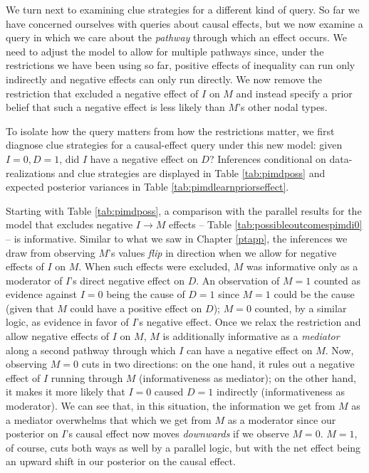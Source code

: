 \documentclass[
  12pt,
]{book}
\begin{document}
We turn next to examining clue strategies for a different kind of query. So far we have concerned ourselves with queries about causal effects, but we now examine a query in which we care about the \emph{pathway} through which an effect occurs. We need to adjust the model to allow for multiple pathways since, under the restrictions we have been using so far, positive effects of inequality can run only indirectly and negative effects can only run directly. We now remove the restriction that excluded a negative effect of \(I\) on \(M\) and instead specify a prior belief that such a negative effect is less likely than \(M\)'s other nodal types.

To isolate how the query matters from how the restrictions matter, we first diagnose clue strategies for a causal-effect query under this new model: given \(I=0, D=1\), did \(I\) have a negative effect on \(D\)? Inferences conditional on data-realizations and clue strategies are displayed in Table \ref{tab:pimdposs} and expected posterior variances in Table \ref{tab:pimdlearnpriorseffect}.

Starting with Table \ref{tab:pimdposs}, a comparison with the parallel results for the model that excludes negative \(I \rightarrow M\) effects -- Table \ref{tab:possibleoutcomespimdi0} -- is informative. Similar to what we saw in Chapter \ref{ptapp}, the inferences we draw from observing \(M\)'s values \emph{flip} in direction when we allow for negative effects of \(I\) on \(M\). When such effects were excluded, \(M\) was informative only as a moderator of \(I\)'s direct negative effect on \(D\). An observation of \(M=1\) counted as evidence against \(I=0\) being the cause of \(D=1\) since \(M=1\) could be the cause (given that \(M\) could have a positive effect on \(D\)); \(M=0\) counted, by a similar logic, as evidence in favor of \(I\)'s negative effect. Once we relax the restriction and allow negative effects of \(I\) on \(M\), \(M\) is additionally informative as a \emph{mediator} along a second pathway through which \(I\) can have a negative effect on \(M\). Now, observing \(M=0\) cuts in two directions: on the one hand, it rules out a negative effect of \(I\) running through \(M\) (informativeness as mediator); on the other hand, it makes it more likely that \(I=0\) caused \(D=1\) indirectly (informativeness as moderator). We can see that, in this situation, the information we get from \(M\) as a mediator overwhelms that which we get from \(M\) as a moderator since our posterior on \(I\)'s causal effect now moves \emph{downwards} if we observe \(M=0\). \(M=1\), of course, cuts both ways as well by a parallel logic, but with the net effect being an upward shift in our posterior on the causal effect.
\end{document}
